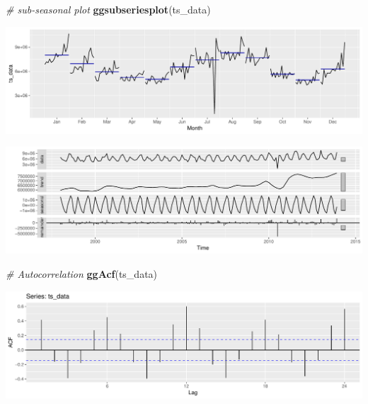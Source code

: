 \documentclass[openany]{book}
\newenvironment{Shaded}{\begin{snugshade}}{\end{snugshade}}
\newcommand{\CommentTok}[1]{\textcolor[rgb]{0.56,0.35,0.01}{\textit{#1}}}
\newcommand{\DataTypeTok}[1]{\textcolor[rgb]{0.13,0.29,0.53}{#1}}
\newcommand{\KeywordTok}[1]{\textcolor[rgb]{0.13,0.29,0.53}{\textbf{#1}}}
\newcommand{\NormalTok}[1]{#1}
\newcommand{\OperatorTok}[1]{\textcolor[rgb]{0.81,0.36,0.00}{\textbf{#1}}}
\newcommand{\StringTok}[1]{\textcolor[rgb]{0.31,0.60,0.02}{#1}}
\begin{document}
\begin{Shaded}
\begin{Highlighting}[]
\CommentTok{# sub-seasonal plot}
\KeywordTok{ggsubseriesplot}\NormalTok{(ts_data)}
\end{Highlighting}
\end{Shaded}

\includegraphics{Part-B-AS_files/figure-latex/unnamed-chunk-3-3.pdf}

\begin{Shaded}
\end{Shaded}

\includegraphics{Part-B-AS_files/figure-latex/unnamed-chunk-3-4.pdf}

\begin{Shaded}
\begin{Highlighting}[]
\CommentTok{# Autocorrelation}
\KeywordTok{ggAcf}\NormalTok{(ts_data)}
\end{Highlighting}
\end{Shaded}

\includegraphics{Part-B-AS_files/figure-latex/unnamed-chunk-3-5.pdf}
\end{document}

